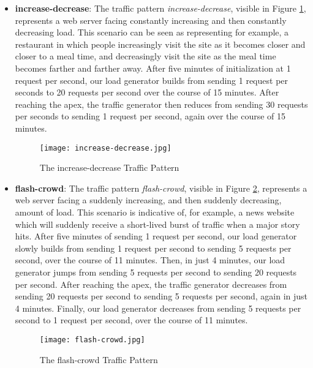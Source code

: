 \begin{itemize}
  \item \textbf{increase-decrease}: The traffic pattern
    \textit{increase-decrease}, visible in Figure \ref{fig:increase-decrease},
    represents a web server facing constantly increasing and then constantly
    decreasing load. This scenario can be seen as representing for example, a
    restaurant in which people increasingly visit the site as it becomes closer
    and closer to a meal time, and decreasingly visit the site as the meal time
    becomes farther and farther away. After five minutes of initialization at
    1 request per second, our load
    generator builds from sending 1 request per seconds to 20 requests per
    second over the course of 15 minutes. After reaching the apex, the traffic
    generator then reduces from sending 30 requests per seconds to sending 1
    request per second, again over the course of 15 minutes.

    \begin{figure}[!h]
      \centerline{\texttt{[image: increase-decrease.jpg]}}
      \caption{The increase-decrease Traffic Pattern}
      \label{fig:increase-decrease}
    \end{figure}

  \item \textbf{flash-crowd}: The traffic pattern \textit{flash-crowd}, visible
    in Figure \ref{fig:flash-crowd}, represents a web server facing a suddenly
    increasing, and then suddenly decreasing, amount of load. This scenario is
    indicative of, for example, a news website which will suddenly receive a
    short-lived burst of traffic when a major story hits. After five minutes of
    sending 1 request per second, our load generator
    slowly builds from sending 1 request per second
    to sending 5 requests per second, over the course of 11 minutes. Then, in
    just 4 minutes, our load generator jumps from sending 5 requests per second
    to sending 20 requests per second. After reaching the apex, the traffic
    generator decreases from sending 20 requests per second to sending 5
    requests per second, again in just 4 minutes. Finally, our load generator
    decreases from sending 5 requests per second to 1 request per second, over
    the course of 11 minutes.

    \begin{figure}[!h]
      \centerline{\texttt{[image: flash-crowd.jpg]}}
      \caption{The flash-crowd Traffic Pattern}
      \label{fig:flash-crowd}
    \end{figure}

\end{itemize}
